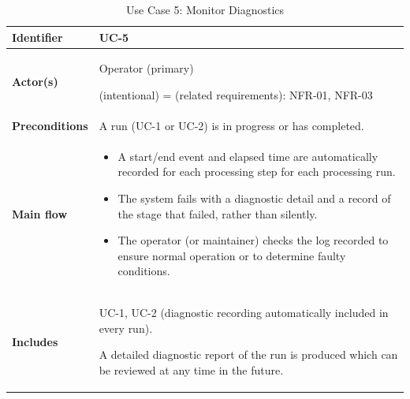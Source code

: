 \begin{longtable}{|p{3.0cm}|p{12.5cm}|}

\caption{Use Case 5: Monitor Diagnostics}
\label{tab:uc5} \\

\hline

\textbf{Identifier} &
UC-5
\\
\hline

\textbf{Actor(s)} &
Operator (primary)

(intentional) = (related requirements): NFR-01, NFR-03
\\
\hline

\textbf{Preconditions} &
A run (UC-1 or UC-2) is in progress or has completed.
\\
\hline

\textbf{Main flow} &
\begin{itemize}[leftmargin=16pt, itemsep=0pt, topsep=0pt]
    \item A start/end event and elapsed time are automatically recorded for each processing step for each processing run.
    
    \item The system fails with a diagnostic detail and a record of the stage that failed, rather than silently.
    
    \item The operator (or maintainer) checks the log recorded to ensure normal operation or to determine faulty conditions.
\end{itemize}
\\
\hline

\textbf{Includes} &
UC-1, UC-2 (diagnostic recording automatically included in every run).

A detailed diagnostic report of the run is produced which can be reviewed at any time in the future.
\\
\hline

\end{longtable}







